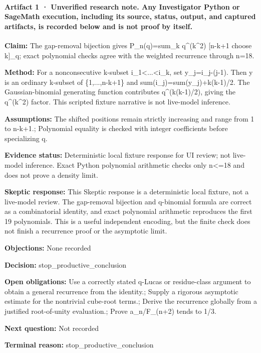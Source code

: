 \documentclass[11pt]{article}
\begin{document}
\paragraph{Artifact 1 · Unverified research note. Any Investigator Python or SageMath execution, including its source, status, output, and captured artifacts, is recorded below and is not proof by itself.}
\textbf{Claim:} The gap-removal bijection gives P\_n(q)=sum\_k q\textasciicircum{}(k\textasciicircum{}2) [n-k+1 choose k]\_q; exact polynomial checks agree with the weighted recurrence through n=18.\par
\textbf{Method:} For a nonconsecutive k-subset i\_1\textless{}...\textless{}i\_k, set y\_j=i\_j-(j-1). Then y is an ordinary k-subset of \{1,...,n-k+1\} and sum(i\_j)=sum(y\_j)+k(k-1)/2. The Gaussian-binomial generating function contributes q\textasciicircum{}(k(k-1)/2), giving the q\textasciicircum{}(k\textasciicircum{}2) factor. This scripted fixture narrative is not live-model inference.\par
\textbf{Assumptions:} The shifted positions remain strictly increasing and range from 1 to n-k+1.; Polynomial equality is checked with integer coefficients before specializing q.\par
\textbf{Evidence status:} Deterministic local fixture response for UI review; not live-model inference. Exact Python polynomial arithmetic checks only n\textless{}=18 and does not prove a density limit.\par
\textbf{Skeptic response:} This Skeptic response is a deterministic local fixture, not a live-model review. The gap-removal bijection and q-binomial formula are correct as a combinatorial identity, and exact polynomial arithmetic reproduces the first 19 polynomials. This is a useful independent encoding, but the finite check does not finish a recurrence proof or the asymptotic limit.\par
\textbf{Objections:} None recorded\par
\textbf{Decision:} stop\_productive\_conclusion\par
\textbf{Open obligations:} Use a correctly stated q-Lucas or residue-class argument to obtain a general recurrence from the identity.; Supply a rigorous asymptotic estimate for the nontrivial cube-root terms.; Derive the recurrence globally from a justified root-of-unity evaluation.; Prove a\_n/F\_(n+2) tends to 1/3.\par
\textbf{Next question:} Not recorded\par
\textbf{Terminal reason:} stop\_productive\_conclusion\par
\end{document}
